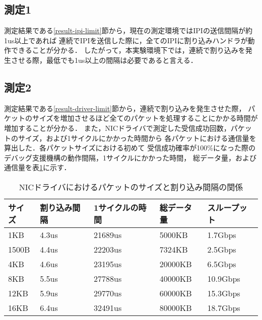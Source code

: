 \documentclass[12pt]{jsarticle}
\begin{document}
\subsection{測定1}

測定結果である\ref{result-ipi-limit}節から，現在の測定環境ではIPIの送信間隔が約1us以上であれば
連続でIPIを送信した際に，全てのIPIに割り込みハンドラが動作できることが分かる．
したがって，本実験環境下では，連続で割り込みを発生させる際，最低でも1us以上の間隔は必要であると言える．

\subsection{測定2}

測定結果である\ref{result-driver-limit}節から，連続で割り込みを発生させた際，
パケットのサイズを増加させるほど全てのパケットを処理することにかかる時間が増加することが分かる．
また，NICドライバで測定した受信成功回数，パケットのサイズ，および1サイクルにかかった時間から
各パケットにおける通信量を算出した．各パケットサイズにおける初めて
受信成功確率が100\%になった際のデバッグ支援機構の動作間隔，1サイクルにかかった時間，
総データ量，および通信量を表\ref{table:driver}に示す．
\begin{table}[h]
    \caption{NICドライバにおけるパケットのサイズと割り込み間隔の関係}
    \label{table:driver}
    \begin{center}
        \begin{tabular}{l|l|l|l|l}   \hline \hline 
            サイズ   & 割り込み間隔      & 1サイクルの時間      & 総データ量   & スループット       \\ \hline
            1KB      & 4.3us            & 21689us              & 5000KB       & 1.7Gbps            \\ 
            1500B    & 4.4us            & 22203us              & 7324KB       & 2.5Gbps            \\ 
            4KB      & 4.6us            & 23195us              & 20000KB      & 6.5Gbps            \\ 
            8KB      & 5.5us            & 27788us              & 40000KB      & 10.9Gbps           \\ 
            12KB     & 5.9us            & 29770us              & 60000KB      & 15.3Gbps           \\ 
            16KB     & 6.4us            & 32491us              & 80000KB      & 18.7Gbps           \\ \hline
        \end{tabular}
    \end{center}
\end{table}
\end{document}
